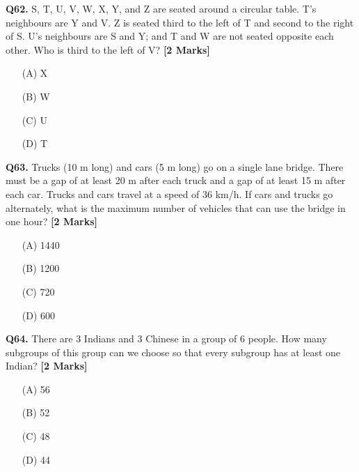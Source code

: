 \documentclass[11pt]{article}
\newcommand{\questionb}[2]{
    \noindent\textbf{Q#2.} #1 \hfill \textbf{[2 Marks]}
}
\begin{document}
\questionb{S, T, U, V, W, X, Y, and Z are seated around a circular table. T's neighbours are Y and V. Z is seated third to the left of T and second to the right of S. U's neighbours are S and Y; and T and W are not seated opposite each other. Who is third to the left of V?}{62}
\begin{enumerate}
    \item[(A)] X  
    \item[(B)] W  
    \item[(C)] U  
    \item[(D)] T  
\end{enumerate}
\vspace{0.5cm}

\questionb{Trucks (10 m long) and cars (5 m long) go on a single lane bridge. There must be a gap of at least 20 m after each truck and a gap of at least 15 m after each car. Trucks and cars travel at a speed of 36 km/h. If cars and trucks go alternately, what is the maximum number of vehicles that can use the bridge in one hour?}{63}
\begin{enumerate}
    \item[(A)] 1440  
    \item[(B)] 1200  
    \item[(C)] 720  
    \item[(D)] 600  
\end{enumerate}
\vspace{0.5cm}

\questionb{There are 3 Indians and 3 Chinese in a group of 6 people. How many subgroups of this group can we choose so that every subgroup has at least one Indian?}{64}
\begin{enumerate}
    \item[(A)] 56  
    \item[(B)] 52  
    \item[(C)] 48  
    \item[(D)] 44  
\end{enumerate}
\vspace{0.5cm}
\end{document}
